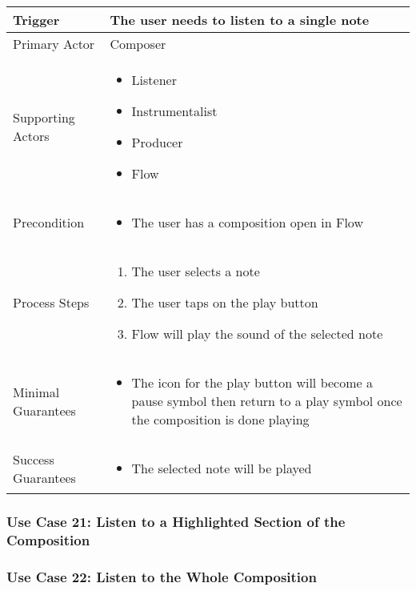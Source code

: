   \begin{tabularx}{\textwidth}{|X|X|}
  \hline
  Trigger & 
  The user needs to listen to a single note \\
  \hline
  Primary Actor & 
  Composer \\
  \hline
  Supporting Actors & 
  \begin{itemize}
  \item Listener
  \item Instrumentalist
  \item Producer
  \item Flow
  \end{itemize} \\
  \hline
  Precondition & 
  \begin{itemize}
  \item The user has a composition open in Flow
  \end{itemize} \\
  \hline
  Process Steps & 
  \begin{enumerate}
  \item The user selects a note
  \item The user taps on the play button
  \item Flow will play the sound of the selected note
  \end{enumerate} \\
  \hline
  Minimal Guarantees & 
  \begin{itemize}
   \item The icon for the play button will become a pause symbol then return to a play symbol once the composition is done playing
  \end{itemize} \\
  \hline
  Success Guarantees & 
  \begin{itemize}
    \item The selected note will be played
  \end{itemize} \\
  \hline
  \end{tabularx}

  \subsubsection{Use Case 21: Listen to a Highlighted Section of the Composition}


  \subsubsection{Use Case 22: Listen to the Whole Composition}

